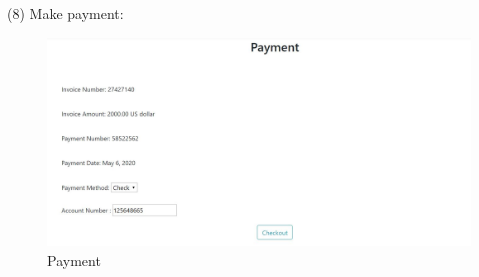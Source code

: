 \documentclass[12pt]{article}
\begin{document}
	\noindent (8) Make payment:
	\begin{figure}[H]
		\centering
		\includegraphics[scale=0.58]{payment}
		\caption{Payment}
	\end{figure}
	
	\newpage
	
\end{document}
